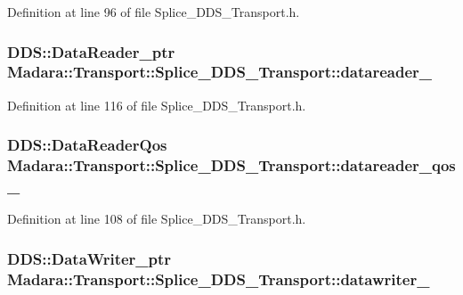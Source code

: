 Definition at line 96 of file Splice\_\-DDS\_\-Transport.h.

\hypertarget{classMadara_1_1Transport_1_1Splice__DDS__Transport_aabe88c57b8967d6d3d0d042a519d40aa}{
\subsubsection[{datareader\_\-}]{\setlength{\rightskip}{0pt plus 5cm}DDS::DataReader\_\-ptr {\bf Madara::Transport::Splice\_\-DDS\_\-Transport::datareader\_\-}}}
\label{d0/d91/classMadara_1_1Transport_1_1Splice__DDS__Transport_aabe88c57b8967d6d3d0d042a519d40aa}


Definition at line 116 of file Splice\_\-DDS\_\-Transport.h.

\hypertarget{classMadara_1_1Transport_1_1Splice__DDS__Transport_a8e1613bba47e72e2b321dda7271440b5}{
\subsubsection[{datareader\_\-qos\_\-}]{\setlength{\rightskip}{0pt plus 5cm}DDS::DataReaderQos {\bf Madara::Transport::Splice\_\-DDS\_\-Transport::datareader\_\-qos\_\-}}}
\label{d0/d91/classMadara_1_1Transport_1_1Splice__DDS__Transport_a8e1613bba47e72e2b321dda7271440b5}


Definition at line 108 of file Splice\_\-DDS\_\-Transport.h.

\hypertarget{classMadara_1_1Transport_1_1Splice__DDS__Transport_ac89ba92fdf1d66d721f8d55a23f1dc62}{
\subsubsection[{datawriter\_\-}]{\setlength{\rightskip}{0pt plus 5cm}DDS::DataWriter\_\-ptr {\bf Madara::Transport::Splice\_\-DDS\_\-Transport::datawriter\_\-}}}
\label{d0/d91/classMadara_1_1Transport_1_1Splice__DDS__Transport_ac89ba92fdf1d66d721f8d55a23f1dc62}


